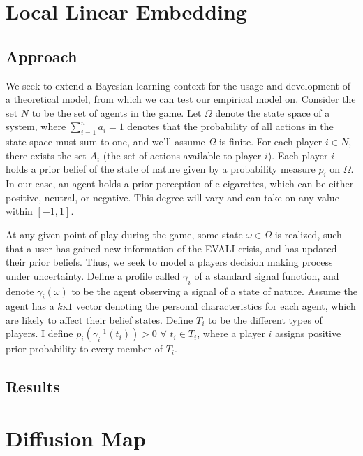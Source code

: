 \documentclass[12pt]{article}
\begin{document}
\section{Local Linear Embedding} \label{sec:Local Linear Embedding}


\subsection{Approach}
\hspace{5mm}We seek to extend a Bayesian learning context for the usage and development of a theoretical model, from which we can test our empirical model on. Consider the set $N$ to be the set of agents in the game. Let $\Omega$ denote the state space of a system, where $\sum\limits_{i=1}^{n}a_i=1$ denotes that the probability of all actions in the state space must sum to one, and we'll assume $\Omega$ is finite. For each player $i\in N$, there exists the set $A_i$ (the set of actions available to player $i$). Each player $i$ holds a prior belief of the state of nature given by a probability measure $p_i$ on $\Omega$. In our case, an agent holds a prior perception of e-cigarettes, which can be either positive, neutral, or negative. This degree will vary and can take on any value within $[-1,1]$. 

At any given point of play during the game, some state $\omega\in\Omega$ is realized, such that a user has gained new information of the EVALI crisis, and has updated their prior beliefs. Thus, we seek to model a players decision making process under uncertainty. Define a profile called $\gamma_i$ of a standard signal function, and denote $\gamma_i(\omega)$ to be the agent observing a signal of a state of nature. Assume the agent has a $k$x$1$ vector denoting the personal characteristics for each agent, which are likely to affect their belief states. Define $T_i$ to be the different types of players. I define $p_i(\gamma_i^{-1}(t_i))>0$ $\forall$ $t_i\in T_i$, where a player $i$ assigns positive prior probability to every member of $T_i$.


\subsection{Results}

\section{Diffusion Map} \label{sec: Diffusion Map}
\end{document}
